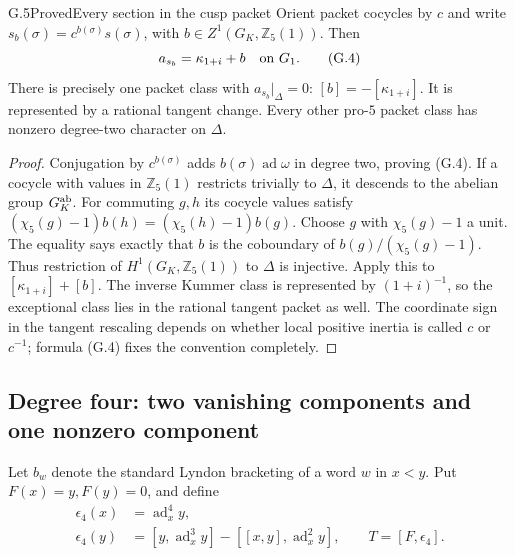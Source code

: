 \begin{statement}{G.5}{Proved}{Every section in the cusp packet}
Orient packet cocycles by $c$ and write
$s_b(\sigma)=c^{b(\sigma)}s(\sigma)$, with
$b\in Z^1(G_K,\mathbb Z_5(1))$. Then
\[
 a_{s_b}=\kappa_{1+i}+b\quad\hbox{on }G_1.                \tag{G.4}
\]
There is precisely one packet class with $a_{s_b}|_\Delta=0$:
$[b]=-[\kappa_{1+i}]$. It is represented by a rational tangent change.
Every other pro-$5$ packet class has nonzero degree-two character on
$\Delta$.
\end{statement}
\begin{proof}
Conjugation by $c^{b(\sigma)}$ adds $b(\sigma)\operatorname{ad}\omega$
in degree two, proving (G.4). If a cocycle with values in
$\mathbb Z_5(1)$ restricts trivially to $\Delta$, it descends to the
abelian group $G_K^{\rm ab}$. For commuting $g,h$ its cocycle values
satisfy
$(\chi_5(g)-1)b(h)=(\chi_5(h)-1)b(g)$.
Choose $g$ with $\chi_5(g)-1$ a unit. The equality says exactly that
$b$ is the coboundary of $b(g)/(\chi_5(g)-1)$. Thus restriction of
$H^1(G_K,\mathbb Z_5(1))$ to $\Delta$ is injective. Apply this to
$[\kappa_{1+i}]+[b]$. The inverse Kummer class is represented by
$(1+i)^{-1}$, so the exceptional class lies in the rational tangent
packet as well. The coordinate sign in the tangent rescaling depends on
whether local positive inertia is called $c$ or $c^{-1}$; formula
(G.4) fixes the convention completely.
\end{proof}

\subsection{Degree four: two vanishing components and one nonzero component}

Let $b_w$ denote the standard Lyndon bracketing of a word $w$ in $x<y$.
Put $F(x)=y,F(y)=0$, and define
\[
 \begin{aligned}
 \epsilon_4(x)&=\operatorname{ad}_x^4y,\\
 \epsilon_4(y)&=[y,\operatorname{ad}_x^3y]
                -[[x,y],\operatorname{ad}_x^2y],\qquad
 T=[F,\epsilon_4].
 \end{aligned}                                             \tag{G.5}
\]

